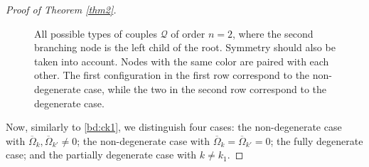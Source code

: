 \documentclass[UTF-8,reqno]{amsart}
\numberwithin{equation}{section}
\theoremstyle{definition}
\begin{document}
\begin{proof}[Proof of Theorem \ref{thm2}]
\begin{figure}
\begin{subfigure}
\begin{tikzpicture}[level distance=.8cm,
  level 1/.style={sibling distance=.8cm},
  level 2/.style={sibling distance=.8cm}]
\end{tikzpicture}
\end{subfigure}
\caption{All possible types of couples $\mathcal{Q}$ of order $n=2$, where the second branching node is the left child of the root. Symmetry should also be taken into account.
Nodes with the same color are paired with each other. The first configuration in the first row correspond to the non-degenerate case, while the two in the second row correspond to the degenerate case.}
\label{fig:type2tree}
\end{figure}

Now, similarly to \eqref{bd:ck1}, we distinguish four cases: the non-degenerate case with $\overline \Omega_k,\overline \Omega_{k'}\neq 0$; the non-degenerate case with $\overline \Omega_k=\overline \Omega_{k'}=0$; the fully degenerate case; and the partially degenerate case with $k\neq k_1$.


\end{proof}
\end{document}
